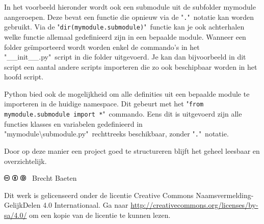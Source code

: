 \documentclass[11pt,twoside]{article}
\begin{document}
In het voorbeeld hieronder wordt ook een submodule uit de subfolder \textsf{mymodule} aangeroepen. Deze bevat een functie die opnieuw via de "\lstinline{.}"\ notatie kan worden gebruikt. Via de "\lstinline{dir(mymodule.submodule)}"\ functie kan je ook achterhalen welke functie allemaal gedefinieerd zijn in een bepaalde module. Wanneer een folder geïmporteerd wordt worden enkel de commando's in het "\textsf{\_\_init\_\_.py}"\ script in die folder uitgevoerd. Je kan dan bijvoorbeeld in dit script een aantal andere scripts importeren die zo ook beschipbaar worden in het hoofd script.


Python bied ook de mogelijkheid om alle definities uit een bepaalde module te importeren in de huidige namespace. Dit gebeurt met het "\lstinline{from mymodule.submodule import *}"\ commando. Eens dit is uitgevoerd zijn alle functies klasses en variabelen gedefinieerd in "\textsf{mymodule\textbackslash submodule.py}"\ rechttreeks beschikbaar, zonder "\lstinline{.}"\ notatie.

Door op deze manier een project goed te structureren blijft het geheel leesbaar en overzichtelijk.
\vspace{2cm}

\null
\vfill
\includegraphics[height=0.3cm]{fig/cc}
\includegraphics[height=0.3cm]{fig/by}
\includegraphics[height=0.3cm]{fig/sa}
\quad \the\year\ Brecht Baeten
\vspace{0.5cm}

Dit werk is gelicenseerd onder de licentie Creative Commons Naamsvermelding-GelijkDelen 4.0 Internationaal. Ga naar \url{http://creativecommons.org/licenses/by-sa/4.0/} om een kopie van de licentie te kunnen lezen.
\vspace{2cm}
\end{document}
